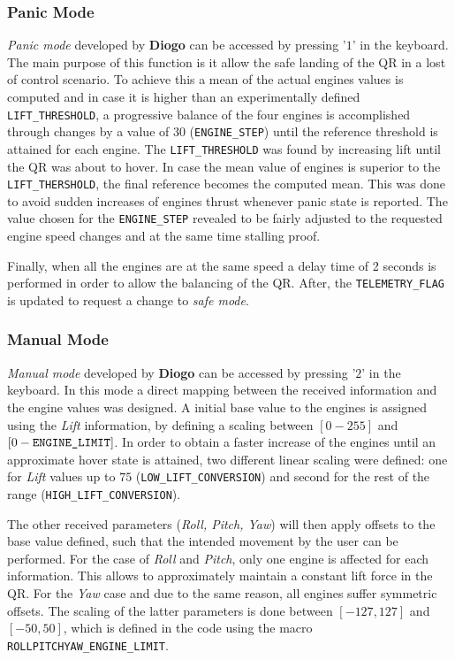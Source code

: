 \documentclass{article}
\begin{document}
\subsubsection{Panic Mode}
\textit{Panic mode} developed by \textbf{Diogo} can be accessed by pressing '$1$' in the keyboard. The main purpose of this function is it allow the safe landing of the QR in a lost of control scenario. To achieve this a mean of the actual engines values is computed and in case it is higher than an experimentally defined \texttt{LIFT\_THRESHOLD}, a progressive balance of the four engines is accomplished through changes by a value of $30$ (\texttt{ENGINE\_STEP}) until the reference threshold is attained for each engine. The \texttt{LIFT\_THRESHOLD} was found by increasing lift until the QR was about to hover.  In case the mean value of engines is superior to the \texttt{LIFT\_THERSHOLD}, the final reference becomes the computed mean. This was done to avoid sudden increases of engines thrust whenever panic state is reported. The value chosen for the \texttt{ENGINE\_STEP} revealed to be fairly adjusted to the requested engine speed changes and at the same time stalling proof.

Finally, when all the engines are at the same speed a delay time of 2 seconds is performed in order to allow the balancing of the QR. After, the \texttt{TELEMETRY\_FLAG} is updated to request a change to \textit{safe mode}.

\subsubsection{Manual Mode}
\textit{Manual mode} developed by \textbf{Diogo} can be accessed by pressing '$2$' in the keyboard. In this mode a direct mapping between the received information and the engine values was designed. A initial base value to the engines is assigned using the \textit{Lift} information, by defining a scaling between $[0-255]$ and $[0-\text{\texttt{ENGINE\_LIMIT}}]$. In order to obtain a faster increase of the engines until an approximate hover state is attained, two different linear scaling were defined: one for \textit{Lift} values up to $75$ (\texttt{LOW\_LIFT\_CONVERSION}) and second for the rest of the range (\texttt{HIGH\_LIFT\_CONVERSION}).

The other received parameters (\textit{Roll, Pitch, Yaw}) will then apply offsets to the base value defined, such that the intended movement by the user can be performed. For the case of \textit{Roll} and \textit{Pitch}, only one engine is affected for each information. This allows to approximately maintain a constant lift force in the QR. For the \textit{Yaw} case and due to the same reason, all engines suffer symmetric offsets. The scaling of the latter parameters is done between $[-127,127]$ and $[-50,50]$, which is defined in the code using the macro \texttt{ROLLPITCHYAW\_ENGINE\_LIMIT}. 
\end{document}
